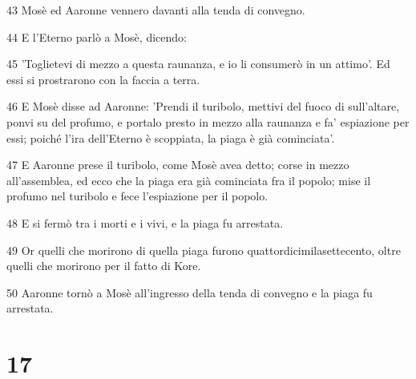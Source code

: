 \par 43 Mosè ed Aaronne vennero davanti alla tenda di convegno.
\par 44 E l'Eterno parlò a Mosè, dicendo:
\par 45 'Toglietevi di mezzo a questa raunanza, e io li consumerò in un attimo'. Ed essi si prostrarono con la faccia a terra.
\par 46 E Mosè disse ad Aaronne: 'Prendi il turibolo, mettivi del fuoco di sull'altare, ponvi su del profumo, e portalo presto in mezzo alla raunanza e fa' espiazione per essi; poiché l'ira dell'Eterno è scoppiata, la piaga è già cominciata'.
\par 47 E Aaronne prese il turibolo, come Mosè avea detto; corse in mezzo all'assemblea, ed ecco che la piaga era già cominciata fra il popolo; mise il profumo nel turibolo e fece l'espiazione per il popolo.
\par 48 E si fermò tra i morti e i vivi, e la piaga fu arrestata.
\par 49 Or quelli che morirono di quella piaga furono quattordicimilasettecento, oltre quelli che morirono per il fatto di Kore.
\par 50 Aaronne tornò a Mosè all'ingresso della tenda di convegno e la piaga fu arrestata.

\chapter{17}

